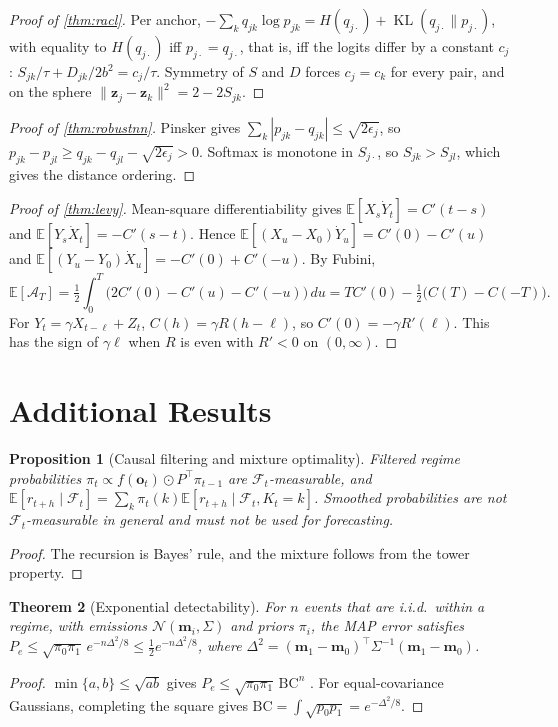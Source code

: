 \documentclass[11pt,a4paper]{article}
\theoremstyle{sci}
\newtheorem{theorem}{Theorem}[section]
\newtheorem{proposition}[theorem]{Proposition}
\theoremstyle{scidef}
\newcommand{\E}{\mathbb{E}}
\newcommand{\N}{\mathcal{N}}
\newcommand{\F}{\mathcal{F}}
\newcommand{\z}{\bm{z}}
\DeclareMathOperator{\KL}{KL}
\begin{document}
\begin{proof}[Proof of \cref{thm:racl}]
Per anchor, $-\sum_kq_{jk}\log p_{jk}=H(q_{j\cdot})+\KL(q_{j\cdot}\|p_{j\cdot})$, with equality to $H(q_{j\cdot})$ iff $p_{j\cdot}=q_{j\cdot}$, that is, iff the logits differ by a constant $c_j$: $S_{jk}/\tau+D_{jk}/2b^2=c_j/\tau$. Symmetry of $S$ and $D$ forces $c_j=c_k$ for every pair, and on the sphere $\|\z_j-\z_k\|^2=2-2S_{jk}$.
\end{proof}

\begin{proof}[Proof of \cref{thm:robustnn}]
Pinsker gives $\sum_k|p_{jk}-q_{jk}|\le\sqrt{2\epsilon_j}$, so $p_{jk}-p_{jl}\ge q_{jk}-q_{jl}-\sqrt{2\epsilon_j}>0$. Softmax is monotone in $S_{j\cdot}$, so $S_{jk}>S_{jl}$, which gives the distance ordering.
\end{proof}

\begin{proof}[Proof of \cref{thm:levy}]
Mean-square differentiability gives $\E[X_s\dot Y_t]=C'(t-s)$ and $\E[Y_s\dot X_t]=-C'(s-t)$. Hence $\E[(X_u-X_0)\dot Y_u]=C'(0)-C'(u)$ and $\E[(Y_u-Y_0)\dot X_u]=-C'(0)+C'(-u)$. By Fubini,
\[
  \E[\mathcal{A}_T]=\tfrac12\int_0^T\big(2C'(0)-C'(u)-C'(-u)\big)\,du=TC'(0)-\tfrac12\big(C(T)-C(-T)\big).
\]
For $Y_t=\gamma X_{t-\ell}+Z_t$, $C(h)=\gamma R(h-\ell)$, so $C'(0)=-\gamma R'(\ell)$. This has the sign of $\gamma\ell$ when $R$ is even with $R'<0$ on $(0,\infty)$.
\end{proof}

\section{Additional Results}\label{app:extra}

\begin{proposition}[Causal filtering and mixture optimality]\label{prop:filter}
Filtered regime probabilities $\pi_t\propto f(\bm o_t)\odot P^\top\pi_{t-1}$ are $\F_t$-measurable, and $\E[r_{t+h}\mid\F_t]=\sum_k\pi_t(k)\E[r_{t+h}\mid\F_t,K_t=k]$. Smoothed probabilities are not $\F_t$-measurable in general and must not be used for forecasting.
\end{proposition}
\begin{proof}
The recursion is Bayes' rule, and the mixture follows from the tower property.
\end{proof}

\begin{theorem}[Exponential detectability]\label{thm:detect}
For $n$ events that are i.i.d.\ within a regime, with emissions $\N(\bm m_i,\Sigma)$ and priors $\pi_i$, the MAP error satisfies $P_e\le\sqrt{\pi_0\pi_1}\,e^{-n\Delta^2/8}\le\tfrac12e^{-n\Delta^2/8}$, where $\Delta^2=(\bm m_1-\bm m_0)^\top\Sigma^{-1}(\bm m_1-\bm m_0)$.
\end{theorem}
\begin{proof}
$\min\{a,b\}\le\sqrt{ab}$ gives $P_e\le\sqrt{\pi_0\pi_1}\,\mathrm{BC}^n$ \citep{bhattacharyya1943,kailath1967}. For equal-covariance Gaussians, completing the square gives $\mathrm{BC}=\int\sqrt{p_0p_1}=e^{-\Delta^2/8}$.
\end{proof}
\end{document}
